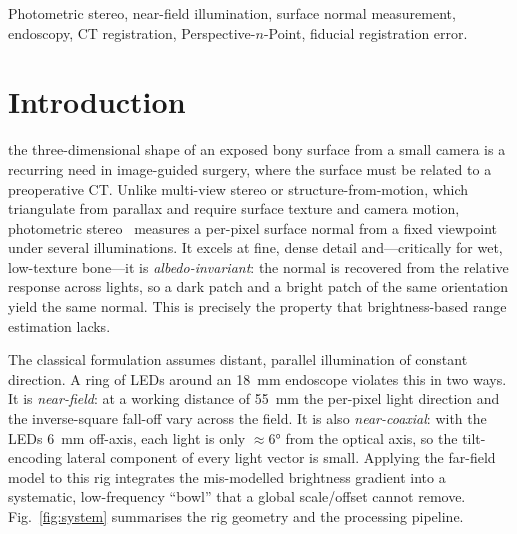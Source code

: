 \documentclass[journal]{IEEEtran}
\begin{document}
\begin{IEEEkeywords}
Photometric stereo, near-field illumination, surface normal measurement, endoscopy,
CT registration, Perspective-$n$-Point, fiducial registration error.
\end{IEEEkeywords}

\section{Introduction}
 the three-dimensional shape of an exposed bony surface
from a small camera is a recurring need in image-guided surgery, where the surface
must be related to a preoperative CT. Unlike multi-view stereo or
structure-from-motion, which triangulate from parallax and require surface texture
and camera motion, photometric stereo~\cite{woodham} measures a per-pixel surface
normal from a fixed viewpoint under several illuminations. It excels at fine,
dense detail and---critically for wet, low-texture bone---it is
\emph{albedo-invariant}: the normal is recovered from the relative response across
lights, so a dark patch and a bright patch of the same orientation yield the same
normal. This is precisely the property that brightness-based range estimation lacks.

The classical formulation assumes distant, parallel illumination of constant
direction. A ring of LEDs around an \SI{18}{\milli\meter} endoscope violates this in
two ways. It is \emph{near-field}: at a working distance of \SI{55}{\milli\meter} the
per-pixel light direction and the inverse-square fall-off vary across the field. It
is also \emph{near-coaxial}: with the LEDs \SI{6}{\milli\meter} off-axis, each light
is only $\approx\!\ang{6}$ from the optical axis, so the tilt-encoding lateral
component of every light vector is small. Applying the far-field model to this rig
integrates the mis-modelled brightness gradient into a systematic, low-frequency
``bowl'' that a global scale/offset cannot remove. Fig.~\ref{fig:system} summarises
the rig geometry and the processing pipeline.
\end{document}
